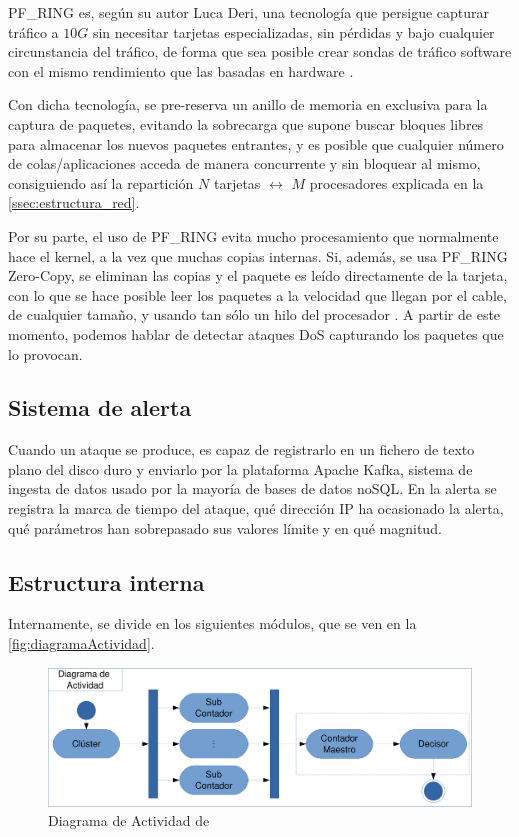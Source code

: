 PF\_RING es, según su autor Luca Deri, una tecnología que 
persigue capturar tráfico a $10G$ sin necesitar tarjetas especializadas, sin pérdidas y bajo cualquier
circunstancia del tráfico, de forma que sea posible crear sondas de tráfico software con el mismo 
rendimiento que las basadas en hardware \cite{LucaDeriPFRING}.

Con dicha tecnología, se pre-reserva un anillo de memoria en exclusiva para la captura de paquetes,
evitando la sobrecarga que supone buscar bloques libres para almacenar los nuevos paquetes entrantes,
y es posible que cualquier número de colas/aplicaciones acceda de manera concurrente y sin bloquear al mismo,
consiguiendo así la repartición $N$ tarjetas $\leftrightarrow$ $M$ procesadores explicada en
la \autoref{ssec:estructura_red}.

Por su parte, el uso de PF\_RING evita mucho procesamiento que normalmente hace el kernel, a la vez que
muchas copias internas. Si, además, se usa PF\_RING Zero-Copy, se eliminan las copias y el paquete es leído
directamente de la tarjeta, con lo que se hace posible leer los paquetes a la velocidad que llegan por
el cable, de cualquier tamaño, y usando tan sólo un hilo del procesador \cite{PFRingZc}. A partir de este momento,
podemos hablar de detectar ataques \gls{DoS} capturando los paquetes que lo provocan.

\subsection{Sistema de alerta}
Cuando un ataque se produce, \redborderddos{} es capaz de registrarlo en un fichero de texto
plano del disco duro y enviarlo por la plataforma Apache Kafka, sistema
de ingesta de datos usado por la mayoría de bases de datos noSQL. En la 
alerta se registra la marca de tiempo del ataque, qué dirección IP ha ocasionado la alerta,
qué parámetros han sobrepasado sus valores límite y en qué magnitud.

\subsection{Estructura interna}
Internamente, \redborderddos{} se divide en los siguientes módulos, que se ven en la
\autoref{fig:diagramaActividad}.

\begin{figure}[htbp]
\includegraphics[width=\columnwidth]{CapituloEstructura/Figuras/DiagramaFlow-crop}
\caption{Diagrama de Actividad de \redborderddos}
\label{fig:diagramaActividad}
\end{figure}

